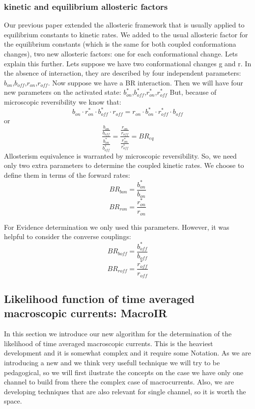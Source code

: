 \documentclass[pdflatex,sn-mathphys-num]{sn-jnl}%
\theoremstyle{thmstyleone}%
\theoremstyle{thmstyletwo}%
\theoremstyle{thmstylethree}%
\begin{document}
\subsubsection{kinetic and equilibrium allosteric factors}
Our previous paper extended the allosteric framework that is usually applied to equilibrium constants to kinetic rates. We added to the usual allosteric factor for the equilibrium constants (which is the same for both coupled conformationa changes), two new allosteric factors: one for each conformational change. 
Lets explain this further. Lets suppose we have two conformational changes g and r. In the absence of interaction, they are described by four independent parameters: $b_{on}$,$b_{off}$,$r_{on}$,$r_{off}$. 
Now suppose we have a BR interaction. Then we will have four new parameters on the activated state: $b^*_{on}$,$b^*_{off}$,$r^*_{on}$,$r^*_{off}$ But, because of microscopic reversibility we know that: 
$$ b_{on} \cdot r^*_{on} \cdot b^*_{off} \cdot r_{off} = r_{on} \cdot b^*_{on} \cdot r^*_{off} \cdot b_{off} $$
or 
$$ \frac {\frac {b_{on}}{b_{off}}}{\frac {b^*_{on}} {b^*_{off}}}     =  \frac {\frac {r_{on}}{r_{off}}}{\frac {r^*_{on}} {r^*_{off}}} =BR_{eq}  $$
Allosterism equivalence is warranted by microscopic reversibility. 
So, we need only two extra parameters to determine the coupled kinetic rates. We choose to define them in terms of the forward rates: 
$$ BR_{b{on}} = \frac{b^*_{on}}{b_{on}}$$
$$ BR_{r{on}} = \frac{r^*_{on}}{r_{on}}$$

For Evidence determination we only used this parameters. However, it was helpful to consider the converse couplings: 
$$ BR_{b{off}} = \frac{b^*_{off}}{b_{off}}$$
$$ BR_{r{off}} = \frac{r^*_{off}}{r_{off}}$$




\subsection{Likelihood function of time averaged macroscopic currents: MacroIR}
In this section we introduce our new algorithm for the determination of the likelihood of time averaged macroscopic currents. This is the heaviest development and it is somewhat complex and it require some Notation.  
As we are introducing a new and we think very usefull technique we will try to be pedagogical, so we will first ilustrate the concepts on the case we have only one channel to build from there the complex case of macrocurrents. Also, we are developing techniques that are also relevant for single channel, so it is worth the space.   
\end{document}
